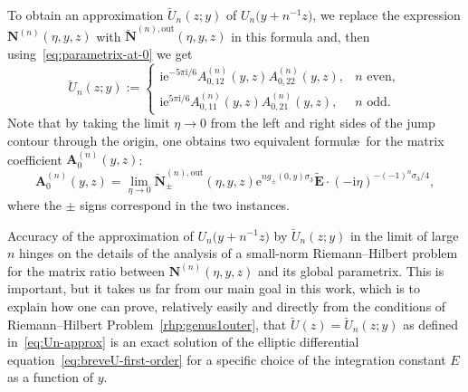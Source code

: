 To obtain an approximation $\breve{U}_n(z;y)$ of $U_n\bigl(y+n^{-1}z\bigr)$, we replace
the expression $\mathbf{N}^{(n)}(\eta,y,z)$ with $\breve{\mathbf{N}}^{(n),\mathrm{out}}(\eta,y,z)$ in this formula and, then using~\eqref{eq:parametrix-at-0} we get
\begin{equation}
\breve{U}_n(z;y):=\begin{cases}\mathrm{i}\mathrm{e}^{-5\pi\mathrm{i}/6}A^{(n)}_{0,12}(y,z)A^{(n)}_{0,22}(y,z),&\text{$n$ even},\\\mathrm{i}\mathrm{e}^{5\pi\mathrm{i}/6}A^{(n)}_{0,11}(y,z)A^{(n)}_{0,21}(y,z),&\text{$n$ odd}.\end{cases}
\label{eq:Un-approx}
\end{equation}
Note that by taking the limit $\eta\to 0$ from the left and right sides of the jump contour through the origin, one obtains two equivalent formul\ae\ for the matrix coefficient $\mathbf{A}^{(n)}_0(y,z)$:
\begin{equation*}
\mathbf{A}^{(n)}_0(y,z)=\lim_{\eta\to 0}\breve{\mathbf{N}}^{(n),\mathrm{out}}_\pm(\eta,y,z)\mathrm{e}^{ng_\pm(0,y)\sigma_3}\widetilde{\mathbf{E}}\cdot (-\mathrm{i}\eta)^{-(-1)^n\sigma_3/4},
\end{equation*}
where the $\pm$ signs correspond in the two instances.

Accuracy of the approximation of $U_n\bigl(y+n^{-1}z\bigr)$ by $\breve{U}_n(z;y)$ in the limit of large $n$ hinges on the details of the analysis of a small-norm Riemann--Hilbert problem for the matrix ratio between $\mathbf{N}^{(n)}(\eta,y,z)$ and its global parametrix. This is important, but it takes us far from our main goal in this work, which is to explain how one can prove, relatively easily and directly from the conditions of Riemann--Hilbert Problem~\ref{rhp:genus1outer}, that $\breve{U}(z)=\breve{U}_n(z;y)$ as defined in~\eqref{eq:Un-approx} is an exact solution of the elliptic differential equation~\eqref{eq:breveU-first-order} for a specific choice of the integration constant $E$ as a function of $y$.

